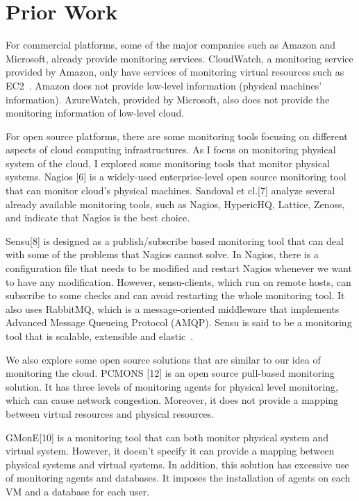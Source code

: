 

\section{Prior Work}
\label{sec:PriorWork}

For commercial platforms, some of the major companies such as Amazon and Microsoft, already provide monitoring services. CloudWatch, a monitoring service provided by Amazon, only have services of monitoring virtual resources such as EC2~\cite{Aceto2013}. Amazon does not provide low-level information (physical machines’ information). AzureWatch, provided by Microsoft, also does not provide the monitoring information of low-level cloud. 

For open source platforms, there are some monitoring tools focusing on different aspects of cloud computing infrastructures. As I focus on monitoring physical system of the cloud, I explored some monitoring tools that monitor physical systems. Nagios [6] is a widely-used enterprise-level open source monitoring tool that can monitor cloud’s physical machines. Sandoval et cl.[7] analyze several already available monitoring tools, such as Nagios, HypericHQ, Lattice, Zenoss, and indicate that Nagios is the best choice. 

Sensu[8] is designed as a publish/subscribe based monitoring tool that can deal with some of the problems that Nagios cannot solve. In Nagios, there is a configuration file that needs to be modified and restart Nagios whenever we want to have any modification. However, sensu-clients, which run on remote hosts, can subscribe to some checks and can avoid restarting the whole monitoring tool. It also uses RabbitMQ, which is a message-oriented middleware that implements Advanced Message Queueing Protocol (AMQP). Sensu is said to be a monitoring tool that is scalable, extensible and elastic~\cite{Aceto2013}. 

We also explore some open source solutions that are similar to our idea of monitoring the cloud. PCMONS [12] is an open source pull-based monitoring solution. It has three levels of monitoring agents for physical level monitoring, which can cause network congestion. Moreover, it does not provide a mapping between virtual resources and physical resources. 

GMonE[10] is a monitoring tool that can both monitor physical system and virtual system. However, it doesn’t specify it can provide a mapping between physical systems and virtual systems. In addition, this solution has excessive use of monitoring agents and databases. It imposes the installation of agents on each VM and a database for each user. 

